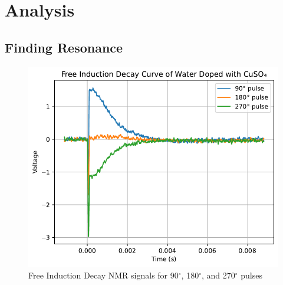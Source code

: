 \documentclass{article}
\begin{document}
\newpage

\section{Analysis}\label{sec:analysis}

\subsection{Finding Resonance}\label{subsec:finding-resonance}

\begin{figure}[h]
    \centering
    \includegraphics[scale = 0.78]{../images/B1}
    \caption{Free Induction Decay NMR signals for 90$^{\circ}$, 180$^{\circ}$, and 270$^{\circ}$ pulses}
    \label{fig:B1_FID}
\end{figure}
\end{document}
